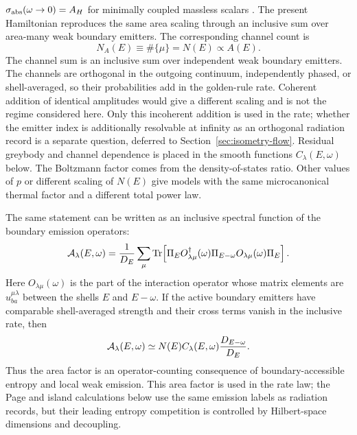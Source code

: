 \documentclass[12pt]{article}
\newcommand{\Tr}{\mathrm{Tr}}
\begin{document}
$\sigma_{\rm abs}(\omega\to0)=A_H$ for minimally coupled massless scalars
\cite{Page1976,DasGibbonsMathur1997}.  The present Hamiltonian reproduces the
same area scaling through an inclusive sum over area-many weak boundary
emitters.  The corresponding channel count is
\begin{equation}
    N_A(E)\equiv \#\{\mu\}=N(E)\propto A(E).
\end{equation}
The channel sum is an inclusive sum over independent weak boundary emitters.
The channels are orthogonal in the outgoing continuum, independently phased,
or shell-averaged, so their probabilities add in the golden-rule rate.
Coherent addition of identical amplitudes would give a different scaling and is
not the regime considered here.  Only this incoherent addition is used in
the rate; whether the emitter index is additionally resolvable at infinity
as an orthogonal radiation record is a separate question, deferred to
Section~\ref{sec:isometry-flow}.
Residual greybody and channel dependence is placed in the smooth functions
$C_\lambda(E,\omega)$ below.  The Boltzmann factor comes from the
density-of-states ratio.  Other values of $p$ or different scaling of
$N(E)$ give models with the same microcanonical thermal factor and a different
total power law.

The same statement can be written as an inclusive spectral function of the
boundary emission operators:
\begin{equation}
    {\cal A}_\lambda(E,\omega)
    =
    \frac{1}{D_E}
    \sum_\mu
    \Tr\!\left[
    \Pi_E O_{\lambda\mu}^\dagger(\omega)
    \Pi_{E-\omega}
    O_{\lambda\mu}(\omega)\Pi_E
    \right].
\end{equation}
Here $O_{\lambda\mu}(\omega)$ is the part of the interaction operator whose
matrix elements are $u^{\mu\lambda}_{ba}$ between the shells $E$ and
$E-\omega$.
If the active boundary emitters have comparable shell-averaged strength and
their cross terms vanish in the inclusive rate, then
\begin{equation}
    {\cal A}_\lambda(E,\omega)
    \simeq
    N(E) C_\lambda(E,\omega)
    \frac{D_{E-\omega}}{D_E}.
\label{eq:boundary-spectral-function}
\end{equation}
Thus the area factor is an operator-counting consequence of boundary-accessible
entropy and local weak emission.  This area factor is used in the rate law; the
Page and island calculations below use the same emission labels as radiation
records, but their leading entropy competition is controlled by Hilbert-space
dimensions and decoupling.
\end{document}
